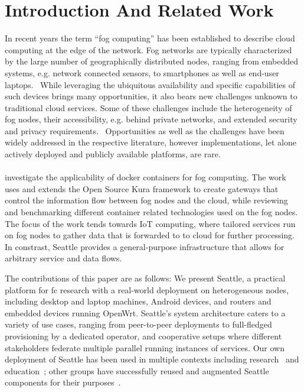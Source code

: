 \section{Introduction And Related Work}
In recent years the term ``fog computing'' has been established to describe
cloud computing at the edge of the network. Fog networks are typically
characterized by the large number of geographically distributed nodes, ranging
from embedded systems, e.g. network connected
sensors, to smartphones as well as end-user laptops.~\cite{Bonomi:2012:FCR:2342509.2342513,Yi:2015:SFC:2757384.2757397}
While leveraging the
ubiquitous availability and specific capabilities of such devices brings
many opportunities, it also bears new challenges unknown to traditional cloud
services. Some of these challenges include the heterogeneity of fog nodes,
their accessibility, e.g. behind private networks, and extended security and
privacy requirements.~\cite{botta_integration_2016}
Opportunities as well as the challenges have been widely addressed in the
respective literature, however implementations, let alone actively deployed and
publicly available platforms, are rare. \\ \\
\cite{bellavista_feasibility_2017} investigate the applicability of docker
containers for fog computing. The work uses and extends the Open Source Kura
framework  to create gateways that control the information
flow between fog nodes and the cloud, while reviewing and benchmarking different
container related technologies used on the fog nodes.
The focus of the work tends towards IoT computing, where tailored services run
on fog nodes to gather data that is forwarded to to cloud for further processing.
In constrast, Seattle provides a general-purpose infrastructure that allows for
arbitrary service and data flows.


The contributions of this paper are as follows:
We present Seattle, a practical platform for \gls{fc} research
with a real-world deployment on heterogeneous nodes,
including desktop and laptop machines, Android devices,
and routers and embedded devices running OpenWrt.
Seattle's system architecture caters to a variety of use cases,
ranging from peer-to-peer deployments to full-fledged
provisioning by a dedicated operator, and cooperative setups
where different stakeholders federate multiple parallel running
instances of services.
Our own deployment of Seattle has been used in multiple contexts
including research~\cite{li2015fence,rafetseder2013sensorium,zhuang2014sensibility,Eisl1010:Service,Tuts1010:Sustained,collares2011smart,zhuang2015privacy,cappos2014blursense,7133607} and education~\cite{Wallace_CCSC_2011,Cappos_CCSCCP_2010,Cappos_CCSCNW_2009,Cappos_SIGCSE_2014,Hooshangi_SIGCSE_2015};
other groups have successfully reused and augmented Seattle components
for their purposes~\cite{chard2010social,chard12ssc,caton2014social,muller2014tomato,tomato,eittenberger2012doubtless,zhuang2012distributed,zhuang2014taking,tredger2013building}.
